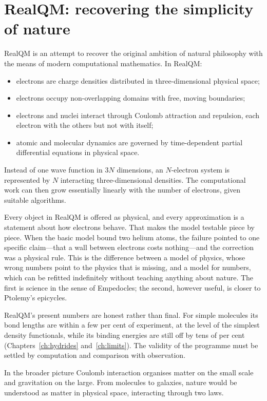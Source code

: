 \section{RealQM: recovering the simplicity of nature}\label{sec:muses-realqm}

RealQM is an attempt to recover the original ambition of natural philosophy with the means of modern
computational mathematics. In RealQM:
\begin{itemize}
\item electrons are charge densities distributed in three-dimensional physical space;
\item electrons occupy non-overlapping domains with free, moving boundaries;
\item electrons and nuclei interact through Coulomb attraction and repulsion, each electron with the others
but not with itself;
\item atomic and molecular dynamics are governed by time-dependent partial differential equations in physical
space.
\end{itemize}
Instead of one wave function in $3N$ dimensions, an $N$-electron system is represented by $N$ interacting
three-dimensional densities. The computational work can then grow essentially linearly with the number of
electrons, given suitable algorithms.

Every object in RealQM is offered as physical, and every approximation is a statement about how electrons
behave. That makes the model testable piece by piece. When the basic model bound two helium atoms, the
failure pointed to one specific claim---that a wall between electrons costs nothing---and the correction was
a physical rule. This is the difference between a model of physics, whose wrong numbers point to the physics
that is missing, and a model for numbers, which can be refitted indefinitely without teaching anything about
nature. The first is science in the sense of Empedocles; the second, however useful, is closer to Ptolemy's
epicycles.

RealQM's present numbers are honest rather than final. For simple molecules its bond lengths are within a
few per cent of experiment, at the level of the simplest density functionals, while its binding energies are
still off by tens of per cent (Chapters~\ref{ch:hydrides} and~\ref{ch:limits}). The validity of the
programme must be settled by computation and comparison with observation.

In the broader picture Coulomb interaction organises matter on the small scale and gravitation on the large.
From molecules to galaxies, nature would be understood as matter in physical space, interacting through two
laws.

